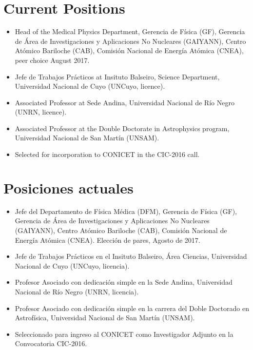 \ifeng
\section*{Current Positions}
\begin{itemize}
	\item Head of the Medical Physics Department, Gerencia de Física (GF), Gerencia de Área de Investigaciones y Aplicaciones No Nucleares (GAIYANN), Centro Atómico Bariloche (CAB), Comisión Nacional de Energía Atómica (CNEA), peer choice August 2017.
  \item Jefe de Trabajos Prácticos at Insituto Balseiro, Science Department, Universidad Nacional de Cuyo (UNCuyo, licence).
  \item Associated Professor at Sede Andina, Universidad Nacional de Río Negro (UNRN, licence).
  \item Associated Professor at the Double Doctorate in Astrophysics program, Universidad Nacional de San Martín (UNSAM).
  \item Selected for incorporation to CONICET in the CIC-2016 call.
\end{itemize}
\else
\section*{Posiciones actuales}
\begin{itemize}
	\item Jefe del Departamento de Física Médica (DFM), Gerencia de Física (GF), Gerencia de Área de Investigaciones y Aplicaciones No Nucleares (GAIYANN), Centro Atómico Bariloche (CAB), Comisión Nacional de Energía Atómica (CNEA). Elección de pares, Agosto de 2017.
	\item Jefe de Trabajos Prácticos en el Insituto Balseiro, Área Ciencias, Universidad Nacional de Cuyo (UNCuyo, licencia).
	\item Profesor Asociado con dedicación simple en la Sede Andina, Universidad Nacional de Río Negro (UNRN, licencia).
	\item Profesor Asociado con dedicación simple en la carrera del Doble Doctorado en Astrofísica, Universidad Nacional de San Martín (UNSAM).
	\item Seleccionado para ingreso al CONICET como Investigador Adjunto en la Convocatoria CIC-2016.
\end{itemize}
\fi


